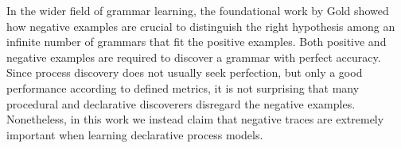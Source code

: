 \documentclass[a4wide,11pt]{article}
\theoremstyle{definition}
\theoremstyle{plain}
\begin{document}
In the wider field of grammar learning, the foundational work by Gold \cite{1967-Gold} showed how negative examples are crucial to distinguish the right hypothesis among an infinite number of grammars that fit the positive examples. Both positive and negative examples are required to discover a grammar with perfect accuracy. Since process discovery does not usually seek perfection, but only a good performance according to defined metrics, it is not surprising that many procedural and declarative discoverers disregard the negative examples. Nonetheless, in this work we instead claim that negative traces are extremely important when learning declarative process models.%
 
\end{document}
